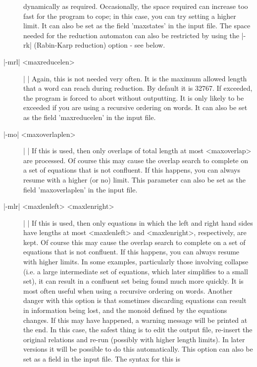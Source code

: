 \begin{description}
dynamically as required. Occasionally, the space required can increase too fast
for the program to cope; in this case, you can try setting a higher limit.
It can also be set as the field 'maxstates' in the input file.
The space needed for the reduction automaton can also be restricted by
using the |-rk| (Rabin-Karp reduction) option - see below.
\item[|-mrl| <maxreducelen>] | |\newline
Again, this is not needed very often. It is the maximum allowed length that
a word can reach during reduction. By default it is 32767.
If exceeded, the program is forced to abort without outputting.
It is only likely to be exceeded if you are using a recursive ordering on words.
It can also be set as the field 'maxreducelen' in the input file.
\item[|-mo| <maxoverlaplen>] | |\newline
If this is used, then only overlaps of total length at most <maxoverlap>
are processed.
Of course this may cause the overlap search to complete on a set
of equations that is not confluent. If this happens, you can always resume
with a higher (or no) limit.
This parameter can also be set as the field 'maxoverlaplen' in the input file.
\item[|-mlr| <maxlenleft> <maxlenright>] | |\newline
If this is used, then only equations in which the left and right hand sides
have lengths at most <maxlenleft> and <maxlenright>, respectively, are
kept. Of course this may cause the overlap search to complete on a set
of equations that is not confluent. If this happens, you can always resume
with higher limits. In some examples, particularly those involving
collapse (i.e. a large intermediate set of equations, which later simplifies
to a small set), it can result in a confluent set being found much more
quickly. It is most often useful when using a recursive ordering on words. 
Another danger with this option is that sometimes discarding equations can
result in information being lost, and the monoid defined by the equations
changes. If this may have happened, a warning message will be printed at
the end. In this case, the safest thing is to edit the output file,
re-insert the original relations and re-run (possibly with higher length
limits). In later versions it will be possible to do this automatically.
This option can also be set as a field in the input file.
The syntax for this is


\end{description}
